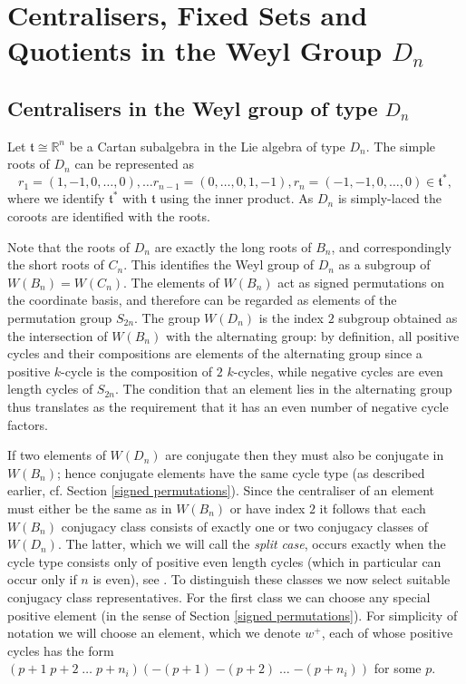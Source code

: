 \documentclass[11pt,a4paper]{article}
\def\t{\mathfrak t}
\def\R{\mathbb{R}}
\def\wplus{w^+}
\begin{document}
\section{Centralisers, Fixed Sets and Quotients in the Weyl Group $D_{n}$}\label{D_n case}

\subsection{Centralisers in the Weyl group of type $D_n$}

Let $\t\cong \R^n$ be a Cartan subalgebra in the Lie algebra of type $D_n$. The simple roots of $D_n$ can be represented as
\[
r_1=(1,-1,0,\dots,0),\dots r_{n-1}=(0,\dots,0,1,-1), r_n=(-1,-1,0,\dots ,0)\in \t^*,
\]
where we identify $\t^*$ with $\t$ using the inner product.  As $D_n$ is simply-laced the coroots are identified with the roots.

Note that the roots of $D_n$ are exactly the long roots of $B_n$, and correspondingly the short roots of $C_n$. This identifies the Weyl group of $D_n$ as a subgroup of $W(B_n)=W(C_n)$.  The elements of $W(B_n)$ act as signed permutations on the coordinate basis, and therefore can be regarded as elements of the permutation group $S_{2n}$.  The group $W(D_n)$ is the index $2$ subgroup obtained as the intersection of $W(B_n)$ with the alternating group: by definition, all positive cycles and their compositions are elements of the alternating group since a positive $k$-cycle is the composition of $2$ $k$-cycles, while negative cycles are even length cycles of $S_{2n}$. The condition that an element lies in the alternating group thus translates as the requirement that it has an even number of negative cycle factors.

If two elements of $W(D_n)$ are conjugate then they must also be conjugate in $W(B_n)$; hence conjugate elements have the same cycle type (as described earlier, cf. Section \ref{signed permutations}). Since the centraliser of an element must either be the same as in $W(B_n)$ or have index $2$ it follows that each $W(B_n)$ conjugacy class consists of exactly one or two conjugacy classes of $W(D_n)$. The latter, which we will call the \emph{split case}, occurs exactly when the cycle type consists only of positive even length cycles (which in particular can occur only if $n$ is even), see \cite{carter}. To distinguish these classes we now select suitable conjugacy class representatives. For the first class we can choose any special positive element (in the sense of Section \ref{signed permutations}). For simplicity of notation we will choose an element, which we denote $\wplus$, each of whose positive cycles has the form $(p+1\; p+2\; \dots \;p+n_{i})({-(p+1)}\; {-(p+2)}\; \dots \;{-(p+n_{i})})$ for some $p$.
\end{document}
